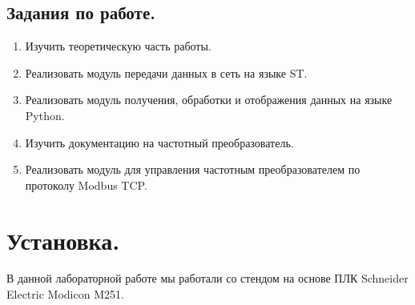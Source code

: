 \documentclass[a4paper, 12pt]{article}
\begin{document}
    
    \subsection{Задания по работе.}
    \begin{enumerate}
        \item Изучить теоретическую часть работы.
        \item Реализовать модуль передачи данных в сеть на языке ST.
        \item Реализовать модуль получения, обработки и отображения данных на языке Python.
        \item Изучить документацию на частотный преобразователь.
        \item Реализовать модуль для управления частотным преобразователем по протоколу Modbus TCP.
    \end{enumerate}
    \section{Установка.}
    В данной лабораторной работе мы работали со стендом на основе ПЛК Schneider Electric Modicon M251.
\end{document}
